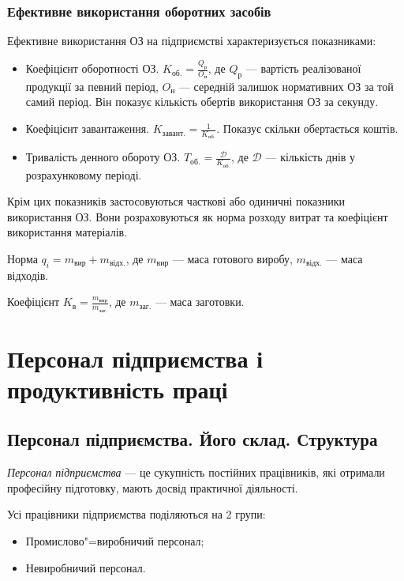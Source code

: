 \documentclass[a5paper,10pt,notitlepage,pdftex,headsepline]{scrartcl}
\begin{document}
    \subsubsection{Ефективне використання оборотних засобів}
      Ефективне використання ОЗ на підприємстві характеризується показниками:
      \begin{itemize}
        \item Коефіцієнт оборотності ОЗ.
          $\displaystyle K_\text{об.} = \frac{Q_\text{р}}{O_\text{н}}$, де
          $Q_\text{р}$ --- вартість реалізованої продукції за певний період,
          $O_\text{н}$ --- середній залишок нормативних ОЗ за той самий
          період.
          Він показує кількість обертів використання ОЗ за секунду.
        \item Коефіцієнт завантаження.
          $\displaystyle K_\text{завант.} = \frac{1}{K_\text{об.}}$.
          Показує скільки обертається коштів.
        \item Тривалість денного обороту ОЗ.
          $\displaystyle T_\text{об.} = \frac{\mathcal{D}}{K_\text{об.}}$, де
          $\mathcal{D}$ --- кількість днів у розрахунковому періоді.
      \end{itemize}

      Крім цих показників застосовуються часткові або одиничні показники
      використання ОЗ.
      Вони розраховуються як норма розходу витрат та коефіцієнт використання
      матеріалів.

      Норма $q_i = m_\text{вир} + m_\text{відх.}$, де $m_\text{вир}$ --- маса
      готового виробу, $m_\text{відх.}$ --- маса відходів.

      Коефіцієнт $\displaystyle K_\text{в} =
      \frac{m_\text{вир}}{m_\text{заг.}}$, де $m_\text{заг.}$ --- маса
      заготовки.
\section{Персонал підприємства і продуктивність праці}
  \subsection{Персонал підприємства. Його склад. Структура}
    \emph{Персонал підприємства} --- це сукупність постійних працівників, які
    отримали професійну підготовку, мають досвід практичної діяльності.

    Усі працівники підприємства поділяються на 2 групи:
    \begin{itemize}
      \item Промислово"=виробничий персонал;
      \item Невиробничий персонал.
    \end{itemize}
\end{document}
